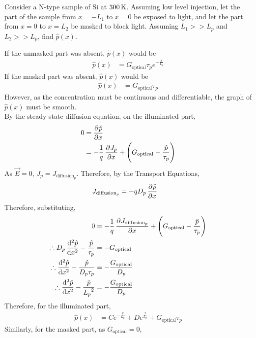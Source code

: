 \documentclass[titlepage, fleqn, a4paper, 12pt, twoside]{article}
\theoremstyle{definition}
\theoremstyle{theorem}
\begin{document}
\begin{question}
	Consider a N-type sample of Si at $300 \kelvin$.
	Assuming low level injection, let the part of the sample from $x = -L_1$ to $x = 0$ be exposed to light, and let the part from $x = 0$ to $x = L_2$ be masked to block light.
	Assuming $L_1 >> L_p$ and $L_2 >> L_p$, find $\hat{p}(x)$.
\end{question}

\begin{solution}
	If the unmasked part was absent, $\hat{p}(x)$ would be
	\begin{align*}
		\hat{p}(x) &= G_{\text{optical}} \tau_p e^{-\frac{x}{L_p}}
	\end{align*}
	If the masked part was absent, $\hat{p}(x)$ would be
	\begin{align*}
		\hat{p}(x) &= G_{\text{optical}} \tau_p
	\end{align*}
	However, as the concentration must be continuous and differentiable, the graph of $\hat{p}(x)$ must be smooth.\\
	By the steady state diffusion equation, on the illuminated part,
	\begin{align*}
		0 &= \dpd{\hat{p}}{x}\\
		&= -\frac{1}{q} \dpd{J_p}{x} + \left( G_{\text{optical}} - \frac{\hat{p}}{\tau_p} \right)
	\end{align*}
	As $\overrightarrow{E} = 0$, $J_p = J_{\text{diffusion}_p}$.
	Therefore, by the Transport Equations, 
	\begin{align*}
		J_{\text{diffusion}_p} &= -q D_p \dpd{\hat{p}}{x}
	\end{align*}
	Therefore, substituting,
	\begin{align*}
		0 &= -\frac{1}{q} \dpd{J_{\text{diffusion}_p}}{x} + \left( G_{\text{optical}} - \frac{\hat{p}}{\tau_p} \right)\\
		\therefore D_p \dod[2]{\hat{p}}{x} - \frac{\hat{p}}{\tau_p} &= -G_{\text{optical}}\\
		\therefore \dod[2]{\hat{p}}{x} - \frac{\hat{p}}{D_p \tau_p} &= -\frac{G_{\text{optical}}}{D_p}\\
		\therefore \dod[2]{\hat{p}}{x} - \frac{\hat{p}}{{L_p}^2} &= -\frac{G_{\text{optical}}}{D_p}
	\end{align*}
	Therefore, for the illuminated part,
	\begin{align*}
		\hat{p}(x) &= C e^{-\frac{x}{L_p}} + D e^{\frac{x}{L_p}} + G_{\text{optical}} \tau_p
	\end{align*}
	Similarly, for the masked part, as $G_{\text{optical}} = 0$,

\end{solution}
\end{document}
